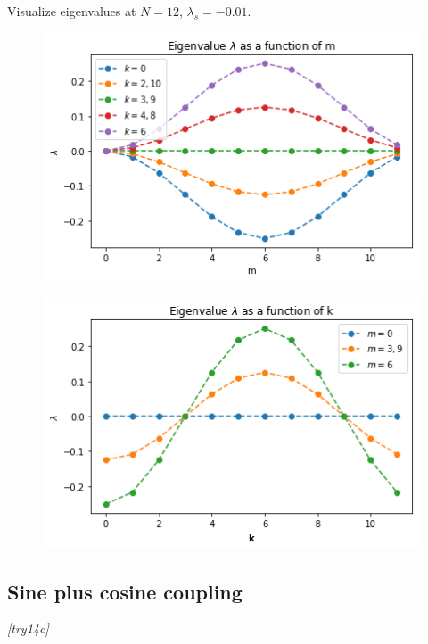 \documentclass[a4paper,12pt]{article}
\begin{document}
Visualize eigenvalues at $N=12$, $\lambda_s = - 0.01$. 


\begin{figure}[h]
    \centering
    \includegraphics[width=.6\textwidth]{assets/theory-2019-08-27-181128169-abc.png}
\end{figure}

\begin{figure}[h]
    \centering
    \includegraphics[width=.6\textwidth]{assets/theory-2019-08-27-181132121-3da.png}
\end{figure}


\clearpage

\subsection{Sine plus cosine coupling}
\textit{[try14c]}
\end{document}

